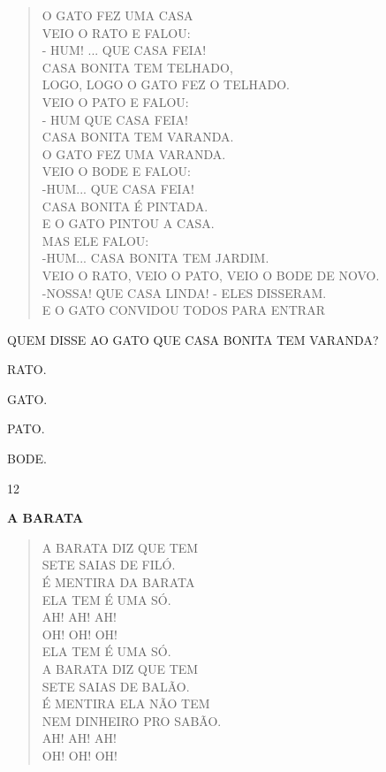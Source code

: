 \begin{verse}
O GATO FEZ UMA CASA\\
VEIO O RATO E FALOU:\\
- HUM! ... QUE CASA FEIA!\\
CASA BONITA TEM TELHADO,\\
LOGO, LOGO O GATO FEZ O TELHADO.\\
VEIO O PATO E FALOU:\\
- HUM QUE CASA FEIA!\\
CASA BONITA TEM VARANDA.\\
O GATO FEZ UMA VARANDA.\\
VEIO O BODE E FALOU:\\
-HUM... QUE CASA FEIA!\\
CASA BONITA É PINTADA.\\
E O GATO PINTOU A CASA.\\
MAS ELE FALOU:\\
-HUM... CASA BONITA TEM JARDIM.\\
VEIO O RATO, VEIO O PATO, VEIO O BODE DE NOVO.\\
-NOSSA! QUE CASA LINDA! - ELES DISSERAM.\\
E O GATO CONVIDOU TODOS PARA ENTRAR
\end{verse}

	

QUEM DISSE AO GATO QUE CASA BONITA TEM VARANDA? 

\begin{escolha}
\item RATO.

\item GATO.

\item PATO.

\item BODE.
\end{escolha}

\num{12}

\textbf{A BARATA}

\begin{verse}
A BARATA DIZ QUE TEM\\
SETE SAIAS DE FILÓ.\\
É MENTIRA DA BARATA\\
ELA TEM É UMA SÓ.\\
AH! AH! AH!\\
OH! OH! OH!\\
ELA TEM É UMA SÓ.\\
A BARATA DIZ QUE TEM\\
SETE SAIAS DE BALÃO.\\
É MENTIRA ELA NÃO TEM\\
NEM DINHEIRO PRO SABÃO.\\
AH! AH! AH!\\
OH! OH! OH!
\end{verse}

